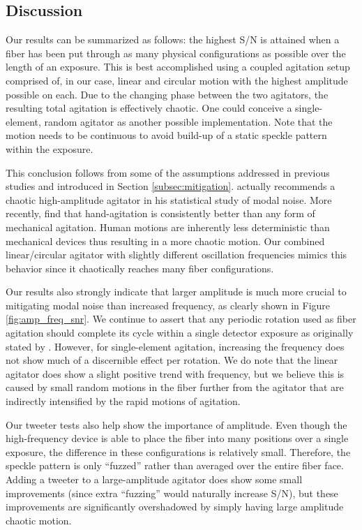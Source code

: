 \documentclass[twocolumn]{emulateapj}
\begin{document}
\subsection{Discussion}
\label{subsec:discussion}

Our results can be summarized as follows: the highest S/N is attained when a fiber has been put through as many physical configurations as possible over the length of an exposure. This is best accomplished using a coupled agitation setup comprised of, in our case, linear and circular motion with the highest amplitude possible on each. Due to the changing phase between the two agitators, the resulting total agitation is effectively chaotic. One could conceive a single-element, random agitator as another possible implementation. Note that the motion needs to be continuous to avoid build-up of a static speckle pattern within the exposure.

This conclusion follows from some of the assumptions addressed in previous studies and introduced in Section \ref{subsec:mitigation}. \citet{Grupp2003} actually recommends a chaotic high-amplitude agitator in his statistical study of modal noise. More recently, \citet{Lemke2011, McCoy2012, Mahadevan2014, Roy2014} find that hand-agitation is consistently better than any form of mechanical agitation. Human motions are inherently less deterministic than mechanical devices thus resulting in a more chaotic motion. Our combined linear/circular agitator with slightly different oscillation frequencies mimics this behavior since it chaotically reaches many fiber configurations.

Our results also strongly indicate that larger amplitude is much more crucial to mitigating modal noise than increased frequency, as clearly shown in Figure \ref{fig:amp_freq_snr}. We continue to assert that any periodic rotation used as fiber agitation should complete its cycle within a single detector exposure as originally stated by \citet{Baudrand2001}. However, for single-element agitation, increasing the frequency does not show much of a discernible effect per rotation. We do note that the linear agitator does show a slight positive trend with frequency, but we believe this is caused by small random motions in the fiber further from the agitator that are indirectly intensified by the rapid motions of agitation.

Our tweeter tests also help show the importance of amplitude. Even though the high-frequency device is able to place the fiber into many positions over a single exposure, the difference in these configurations is relatively small. Therefore, the speckle pattern is only ``fuzzed'' rather than averaged over the entire fiber face. Adding a tweeter to a large-amplitude agitator does show some small improvements (since extra ``fuzzing'' would naturally increase S/N), but these improvements are significantly overshadowed by simply having large amplitude chaotic motion.
\end{document}

